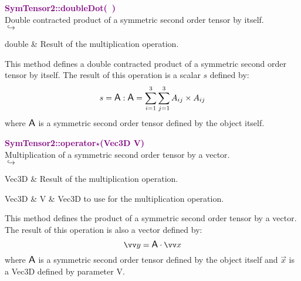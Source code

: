 \textcolor{purple}{\textbf{SymTensor2::doubleDot(~)}}\label{SymTensor2::doubleDot()}\\
Double contracted product of a symmetric second order tensor by itself.\\ \hspace*{5mm}$\hookrightarrow$
\vspace*{-2em}\begin{tcolorbox}[grow to left by=-1cm, width=\textwidth-1cm,myArgs,tabularx={l|R}]
double & Result of the multiplication operation.
\end{tcolorbox}

This method defines a double contracted product of a symmetric second order tensor by itself.
The result of this operation is a scalar $s$ defined by:
\begin{equation*}
s = \mbox{\large\ensuremath{\mathsf{A}}} : \mbox{\large\ensuremath{\mathsf{A}}} = \sum_{i=1}^{3} \sum_{j=1}^{3} A_{ij}\times A_{ij}
\end{equation*}
where $\mbox{\large\ensuremath{\mathsf{A}}}$ is a symmetric second order tensor defined by the object itself.

\textcolor{purple}{\textbf{SymTensor2::operator$\star$(Vec3D V)}}\label{SymTensor2::operator*(Vec3D V)}\\
Multiplication of a symmetric second order tensor by a vector.\\ \hspace*{5mm}$\hookrightarrow$
\vspace*{-2em}\begin{tcolorbox}[grow to left by=-1cm, width=\textwidth-1cm,myArgs,tabularx={l|R}]
Vec3D & Result of the multiplication operation.
\end{tcolorbox}

\begin{tcolorbox}[width=\textwidth,myArgs,tabularx={ll|R}]
Vec3D & V & Vec3D to use for the multiplication operation.
\end{tcolorbox}

This method defines the product of a symmetric second order tensor by a vector.
The result of this operation is also a vector defined by:
\begin{equation*}
\overrightarrow{y} = \A \cdot \overrightarrow{x}
\end{equation*}
where $\mbox{\large\ensuremath{\mathsf{A}}}$ is a symmetric second order tensor defined by the object itself and $\overrightarrow{x}$ is a Vec3D defined by parameter V.

